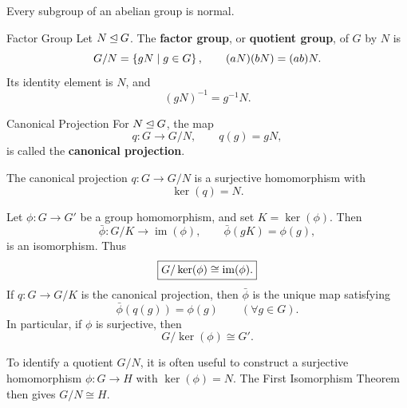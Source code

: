 \documentclass[12pt,a4paper]{article}
\begin{document}
    \begin{cor}
        Every subgroup of an abelian group is normal.
    \end{cor}
    \bigskip
    
    \begin{defi}{Factor Group}
        Let $N \unlhd G$. The \textbf{factor group}, or
        \textbf{quotient group}, of $G$ by $N$ is
        \[
            G/N = \left\{ gN \mid g \in G \right\},
            \qquad
            (aN)(bN) = (ab)N.
        \]
        Its identity element is $N$, and
        \[
            (gN)^{-1} = g^{-1}N.
        \]
    \end{defi}
    \bigskip
    
    \begin{defi}{Canonical Projection}
        For $N \unlhd G$, the map
        \[
            q \colon G \to G/N,
            \qquad
            q(g) = gN,
        \]
        is called the \textbf{canonical projection}.
    \end{defi}
    \bigskip
    
    \begin{thm}
        The canonical projection $q \colon G \to G/N$ is a
        surjective homomorphism with
        \[
            \ker(q) = N.
        \]
    \end{thm}
    \bigskip
    
    \begin{thm}
        Let $\phi \colon G \to G'$ be a group homomorphism, and set
        $K = \ker(\phi)$. Then
        \[
            \bar{\phi} \colon G/K \to \operatorname{im}(\phi),
            \qquad
            \bar{\phi}(gK) = \phi(g),
        \]
        is an isomorphism. Thus
        \[
            \boxed{G/\ker(\phi) \cong \operatorname{im}(\phi).}
        \]
        If $q \colon G \to G/K$ is the canonical projection, then
        $\bar{\phi}$ is the unique map satisfying
        \[
            \bar{\phi}(q(g)) = \phi(g)
            \qquad (\forall g \in G).
        \]
        In particular, if $\phi$ is surjective, then
        \[
            G/\ker(\phi) \cong G'.
        \]
    \end{thm}
    \bigskip
    
    \begin{remark}
        To identify a quotient $G/N$, it is often useful to construct a
        surjective homomorphism $\phi \colon G \to H$ with
        $\ker(\phi)=N$. The First Isomorphism Theorem then gives
        $G/N \cong H$.
    \end{remark}
    \bigskip
    
\end{document}
